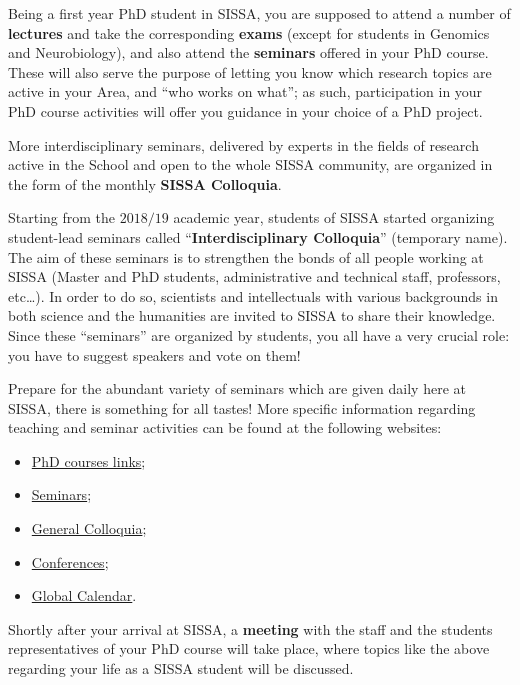 \documentclass{sissavademecum}
\begin{document}
Being a first year PhD student in SISSA, you are supposed to attend a number of\textbf{ lectures }and take the corresponding \textbf{exams} (except for students in Genomics and Neurobiology), and also attend the \textbf{seminars} offered in your PhD course. These will also serve the purpose of letting you know which research topics are active in your Area, and ``who works on what''; as such, participation in your PhD course activities will offer you guidance in your choice of a PhD project.

More interdisciplinary seminars, delivered by experts in the fields of research active in the School and open to the whole SISSA community, are organized in the form of the monthly \textbf{SISSA Colloquia}.

Starting from the $2018/19$ academic year, students of SISSA started organizing student-lead seminars called ``\textbf{Interdisciplinary Colloquia}'' (temporary name). The aim of these seminars is to strengthen the bonds of all people working at SISSA (Master and PhD students, administrative and technical staff, professors, etc\dots). In order to do so, scientists and intellectuals with various backgrounds in both science and the humanities are invited to SISSA to share their knowledge. Since these ``seminars'' are organized by students, you all have a very crucial role: you have to suggest speakers and vote on them!

Prepare for the abundant variety of seminars which are given daily here at SISSA, there is something for all tastes! More specific information regarding teaching and seminar activities can be found at the following websites:

\begin{itemize}
    \item
    \href{https://www.sissa.it/phd-courses}{PhD courses links};
    \item
    \href{https://www.sissa.it/calendar/event-type/seminar}{Seminars};
    \item
    \href{https://www.sissa.it/news/colloquia}{General Colloquia};
    \item
    \href{https://www.sissa.it/news/conferences}{Conferences};
    \item
    \href{https://www.sissa.it/calendar}{Global Calendar}.
\end{itemize}
Shortly after your arrival at SISSA, a \textbf{meeting} with the staff and the students representatives of your PhD course will take place, where topics like the above regarding your life as a SISSA student will be discussed.
\end{document}

